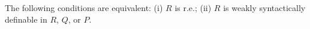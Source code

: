 The following conditions are equivalent:
(i) $R$ is r.e.;
(ii) $R$ is weakly syntactically definable in $R$, $Q$, or $P$.
